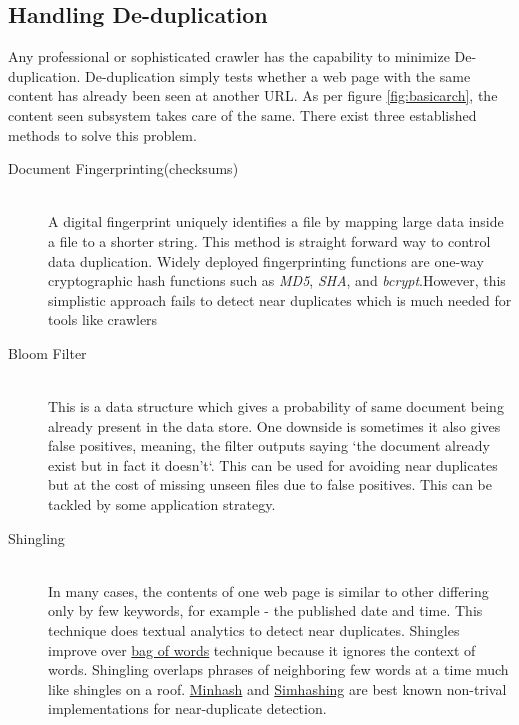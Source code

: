 \subsection{Handling De-duplication}
Any professional or sophisticated crawler has the capability to minimize De-duplication. De-duplication
simply tests whether a web page with the same content has already been seen at another URL. As per
figure \ref{fig:basicarch}, the content seen subsystem takes care of the same. There exist three
established methods to solve this problem. 

\begin{description}
\item[Document Fingerprinting(checksums)] \hfill \\
  A digital fingerprint uniquely identifies a file by mapping large data inside a file to a shorter
  string. This method is straight forward way to control data duplication. Widely deployed fingerprinting
  functions are one-way cryptographic hash functions such as \textit{MD5}, \textit{SHA}, and
  \textit{bcrypt}.However, this simplistic approach fails to detect near duplicates which is much needed
  for tools like crawlers\\ 
\item[Bloom Filter] \hfill \\
  This is a data structure which gives a probability of same document being already present in the data
  store. One downside is sometimes it also gives false positives, meaning, the filter outputs saying
  `the document already exist but in fact it doesn't`. This can be used for avoiding near duplicates but
  at the cost of missing unseen files due to false positives. This can be tackled by some application
  strategy.
\item[Shingling] \hfill \\
  In many cases, the contents of one web page is similar to other differing only by few keywords, for
  example - the published date and time. This technique does textual analytics to detect near duplicates.
  Shingles\cite{dedupe} improve over \underline{bag of words} technique because it ignores the context of
  words. Shingling overlaps phrases of neighboring few words at a time much like shingles on a roof.
  \underline{Minhash} and \underline{Simhashing} are best known non-trival implementations for
  near-duplicate detection.
\end{description}

\pagebreak

